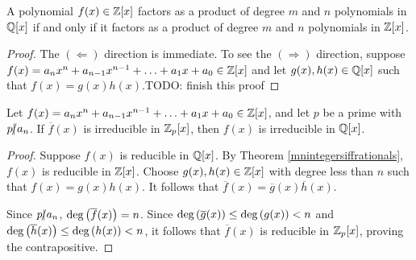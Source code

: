 \documentclass[11pt,fleqn,dvipsnames,usenames]{article}
\newcommand{\p}{\noindent}
\begin{document}
\begin{theorem}\label{mnintegersiffrationals}
A polynomial $f(x)\in \mathbb{Z}[x]$ factors as a product of degree $m$ and $n$ polynomials in $\mathbb{Q}[x]$ if and only if it factors as a product of degree $m$ and $n$ polynomials in $\mathbb{Z}[x]$.
\end{theorem}
%
\begin{proof}
The $(\Leftarrow)$ direction is immediate.  To see the $(\Rightarrow)$ direction, suppose $f(x) = a_{n}x^{n} + a_{n-1}x^{n-1} + \ldots + a_{1}x + a_{0}\in\mathbb{Z}[x]$ and let $g(x),h(x)\in\mathbb{Q}[x]$ such that $f(x) = g(x)h(x)$.{\color{blue}TODO: finish this proof}
\end{proof}
%
\begin{theorem}\label{gausslemma}
Let $f(x) = a_{n}x^{n} + a_{n-1}x^{n-1} + \ldots + a_{1}x + a_{0}\in\mathbb{Z}[x]$, and let $p$ be a prime with $p|\kern-0.9ex{/} a_{n}$.  If $\overline{f}(x)$ is irreducible in $\mathbb{Z}_p[x]$, then $f(x)$ is irreducible in $\mathbb{Q}[x]$.
\end{theorem}
%
\begin{proof}
Suppose $f(x)$ is reducible in $\mathbb{Q}[x]$.  By Theorem \ref{mnintegersiffrationals}, $f(x)$ is reducible in $\mathbb{Z}[x]$.  Choose $g(x),h(x)\in\nolinebreak\ZX$ with degree less than $n$ such that $f(x) = g(x)h(x)$.  It follows that $\overline{f}(x) = \overline{g}(x)\overline{h}(x)$.
\vsp

\p Since $p|\kern-0.9ex{/} a_{n}$, $\text{deg}\left(\overline{f}(x)\right) = n$.  Since $\text{deg}\left(\overline{g}(x)\right)\leq \text{deg}\left(g(x)\right) < n$ and $\text{deg}\left(\overline{h}(x)\right)\leq \text{deg}\left(h(x)\right) < n$, it follows that $\overline{f}(x)$ is reducible in $\mathbb{Z}_{p}[x]$, proving the contrapositive.
\end{proof}
%
\end{document}
